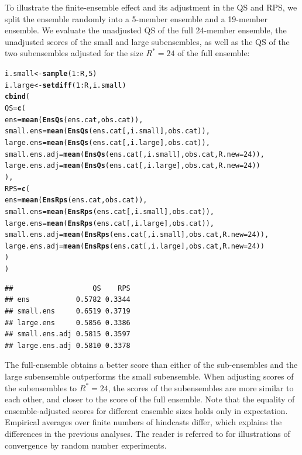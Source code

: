 \documentclass[article]{jss}\usepackage{graphicx, color}
\makeatletter
\newcommand{\hlfunctioncall}[1]{\textcolor[rgb]{0,0.501960784313725,0.752941176470588}{\textbf{#1}}}%
\newenvironment{kframe}{%
 \def\at@end@of@kframe{}%
 \ifinner\ifhmode%
  \def\at@end@of@kframe{\end{minipage}}%
  \begin{minipage}{\columnwidth}%
 \fi\fi%
 \def\FrameCommand##1{\hskip\@totalleftmargin \hskip-\fboxsep
 \colorbox{shadecolor}{##1}\hskip-\fboxsep
     \hskip-\linewidth \hskip-\@totalleftmargin \hskip\columnwidth}%
 \MakeFramed {\advance\hsize-\width
   \@totalleftmargin\z@ \linewidth\hsize
   \@setminipage}}%
 {\par\unskip\endMakeFramed%
 \at@end@of@kframe}
\newenvironment{knitrout}{}{} %
\makeatother
\begin{document}
To illustrate the finite-ensemble effect and its adjustment in the QS and RPS, we split the ensemble randomly into a 5-member ensemble and a 19-member ensemble. 
We evaluate the unadjusted QS of the full 24-member ensemble, the unadjusted scores of the small and large subensembles, as well as the QS of the two subensembles adjusted for the size $R^*=24$ of the full ensemble:
%
\begin{knitrout}
\color{fgcolor}\begin{kframe}
\begin{alltt}
i.small <- \hlfunctioncall{sample}(1:R, 5)
i.large <- \hlfunctioncall{setdiff}(1:R, i.small)
\hlfunctioncall{cbind}(
 QS = \hlfunctioncall{c}(
  ens           = \hlfunctioncall{mean}(\hlfunctioncall{EnsQs}(ens.cat,            obs.cat)),
  small.ens     = \hlfunctioncall{mean}(\hlfunctioncall{EnsQs}(ens.cat[, i.small], obs.cat)),
  large.ens     = \hlfunctioncall{mean}(\hlfunctioncall{EnsQs}(ens.cat[, i.large], obs.cat)),
  small.ens.adj = \hlfunctioncall{mean}(\hlfunctioncall{EnsQs}(ens.cat[, i.small], obs.cat, R.new=24)),
  large.ens.adj = \hlfunctioncall{mean}(\hlfunctioncall{EnsQs}(ens.cat[, i.large], obs.cat, R.new=24))
 ),
 RPS = \hlfunctioncall{c}(
  ens           = \hlfunctioncall{mean}(\hlfunctioncall{EnsRps}(ens.cat,            obs.cat)),
  small.ens     = \hlfunctioncall{mean}(\hlfunctioncall{EnsRps}(ens.cat[, i.small], obs.cat)),
  large.ens     = \hlfunctioncall{mean}(\hlfunctioncall{EnsRps}(ens.cat[, i.large], obs.cat)),
  small.ens.adj = \hlfunctioncall{mean}(\hlfunctioncall{EnsRps}(ens.cat[, i.small], obs.cat, R.new=24)),
  large.ens.adj = \hlfunctioncall{mean}(\hlfunctioncall{EnsRps}(ens.cat[, i.large], obs.cat, R.new=24))
 )
)
\end{alltt}
\begin{verbatim}
##                   QS    RPS
## ens           0.5782 0.3344
## small.ens     0.6519 0.3719
## large.ens     0.5856 0.3386
## small.ens.adj 0.5815 0.3597
## large.ens.adj 0.5810 0.3378
\end{verbatim}
\end{kframe}
\end{knitrout}

%
The full-ensemble obtains a better score than either of the sub-ensembles and the large subensemble outperforms the small subensemble.
When adjusting scores of the subensembles to $R^*=24$, the scores of the subensembles are more similar to each other, and closer to the score of the full ensemble.
Note that the equality of ensemble-adjusted scores for different ensemble sizes holds only in expectation. 
Empirical averages over finite numbers of hindcasts differ, which explains the differences in the previous analyses.
The reader is referred to \citet{ferro2013fair} for illustrations of convergence by random number experiments.
\end{document}
